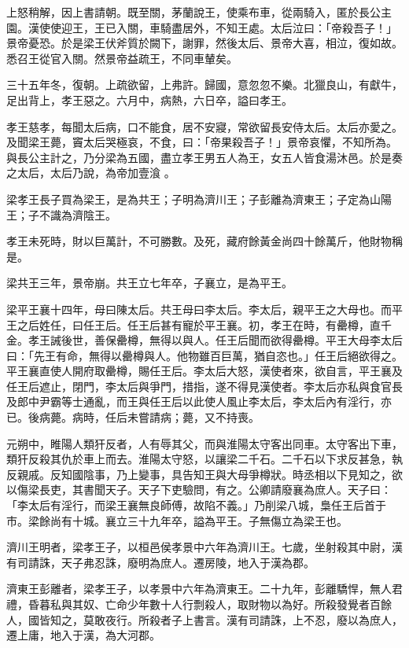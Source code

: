 \begin{pinyinscope}
上怒稍解，因上書請朝。既至關，茅蘭說王，使乘布車，從兩騎入，匿於長公主園。漢使使迎王，王已入關，車騎盡居外，不知王處。太后泣曰：「帝殺吾子！」景帝憂恐。於是梁王伏斧質於闕下，謝罪，然後太后、景帝大喜，相泣，復如故。悉召王從官入關。然景帝益疏王，不同車輦矣。

三十五年冬，復朝。上疏欲留，上弗許。歸國，意忽忽不樂。北獵良山，有獻牛，足出背上，孝王惡之。六月中，病熱，六日卒，謚曰孝王。

孝王慈孝，每聞太后病，口不能食，居不安寢，常欲留長安侍太后。太后亦愛之。及聞梁王薨，竇太后哭極哀，不食，曰：「帝果殺吾子！」景帝哀懼，不知所為。與長公主計之，乃分梁為五國，盡立孝王男五人為王，女五人皆食湯沐邑。於是奏之太后，太后乃說，為帝加壹湌 。

梁孝王長子買為梁王，是為共王；子明為濟川王；子彭離為濟東王；子定為山陽王；子不識為濟陰王。

孝王未死時，財以巨萬計，不可勝數。及死，藏府餘黃金尚四十餘萬斤，他財物稱是。

梁共王三年，景帝崩。共王立七年卒，子襄立，是為平王。

梁平王襄十四年，母曰陳太后。共王母曰李太后。李太后，親平王之大母也。而平王之后姓任，曰任王后。任王后甚有寵於平王襄。初，孝王在時，有罍樽，直千金。孝王誡後世，善保罍樽，無得以與人。任王后聞而欲得罍樽。平王大母李太后曰：「先王有命，無得以罍樽與人。他物雖百巨萬，猶自恣也。」任王后絕欲得之。平王襄直使人開府取罍樽，賜任王后。李太后大怒，漢使者來，欲自言，平王襄及任王后遮止，閉門，李太后與爭門，措指，遂不得見漢使者。李太后亦私與食官長及郎中尹霸等士通亂，而王與任王后以此使人風止李太后，李太后內有淫行，亦已。後病薨。病時，任后未嘗請病；薨，又不持喪。

元朔中，睢陽人類犴反者，人有辱其父，而與淮陽太守客出同車。太守客出下車，類犴反殺其仇於車上而去。淮陽太守怒，以讓梁二千石。二千石以下求反甚急，執反親戚。反知國陰事，乃上變事，具告知王與大母爭樽狀。時丞相以下見知之，欲以傷梁長吏，其書聞天子。天子下吏驗問，有之。公卿請廢襄為庶人。天子曰：「李太后有淫行，而梁王襄無良師傅，故陷不義。」乃削梁八城，梟任王后首于市。梁餘尚有十城。襄立三十九年卒，謚為平王。子無傷立為梁王也。

濟川王明者，梁孝王子，以桓邑侯孝景中六年為濟川王。七歲，坐射殺其中尉，漢有司請誅，天子弗忍誅，廢明為庶人。遷房陵，地入于漢為郡。

濟東王彭離者，梁孝王子，以孝景中六年為濟東王。二十九年，彭離驕悍，無人君禮，昏暮私與其奴、亡命少年數十人行剽殺人，取財物以為好。所殺發覺者百餘人，國皆知之，莫敢夜行。所殺者子上書言。漢有司請誅，上不忍，廢以為庶人，遷上庸，地入于漢，為大河郡。


\end{pinyinscope}
